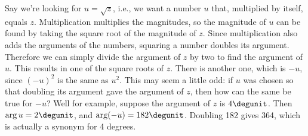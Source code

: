 Say we're looking for $u=\sqrt{z}$, i.e., we want a number $u$ that,
multiplied by itself, equals $z$. Multiplication multiplies the
magnitudes, so the magnitude of $u$ can be found by taking the square
root of the magnitude of $z$. Since multiplication also adds the
arguments of the numbers, squaring a number doubles its argument.
Therefore we can simply divide the argument of $z$ by two to find the
argument of $u$. This results in one of the square roots of $z$.
There is another one, which is $-u$, since $(-u)^2$ is the same as
$u^2$. This may seem a little odd: if $u$ was chosen so that doubling
its argument gave the argument of $z$, then how can the same be true
for $-u$? Well for example, suppose the argument of $z$ is
$4\degunit$. Then $\arg u=2\degunit$, and $\arg(-u)=182\degunit$.
Doubling 182 gives 364, which is actually a synonym for 4 degrees.
